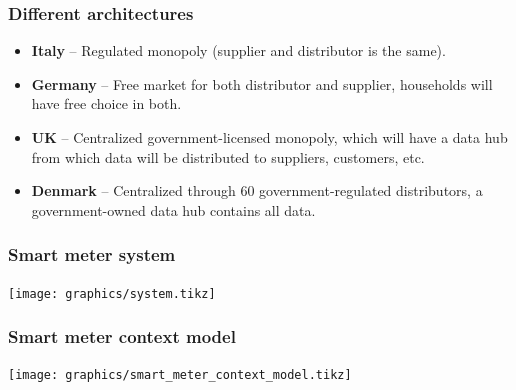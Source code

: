 \begin{frame}
  \frametitle{Different architectures}
  \begin{itemize}
	\item \textbf{Italy} -- Regulated monopoly (supplier and distributor is the same).
	\item \textbf{Germany} -- Free market for both distributor and supplier, households will have free choice in both.
	\item \textbf{UK} -- Centralized government-licensed monopoly, which will have a data hub from which data will be distributed to suppliers, customers, etc.
	\item \textbf{Denmark} -- Centralized through 60 government-regulated distributors, a government-owned data hub contains all data.
\end{itemize}

\end{frame}

\begin{frame}
  \frametitle{Smart meter system}
  \texttt{[image: graphics/system.tikz]}
\end{frame}

\begin{frame}
  \frametitle{Smart meter context model}
  \texttt{[image: graphics/smart\_meter\_context\_model.tikz]}
\end{frame}
